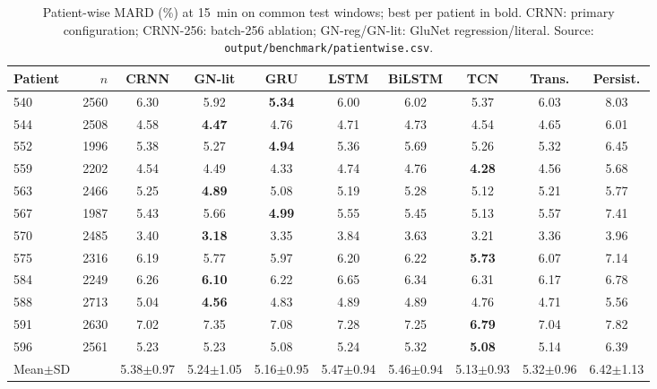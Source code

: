 \begin{table}[t]\centering
\caption{Patient-wise MARD (\%) at 15~min on common test windows; best per patient in bold. CRNN: primary configuration; CRNN-256: batch-256 ablation; GN-reg/GN-lit: GluNet regression/literal. Source: \texttt{output/benchmark/patientwise.csv}.}
\scriptsize\setlength{\tabcolsep}{3pt}
\begin{tabular}{lrcccccccc}\toprule
Patient & $n$ & CRNN & GN-lit & GRU & LSTM & BiLSTM & TCN & Trans. & Persist.\\\midrule
540 & 2560 & 6.30 & 5.92 & \textbf{5.34} & 6.00 & 6.02 & 5.37 & 6.03 & 8.03\\
544 & 2508 & 4.58 & \textbf{4.47} & 4.76 & 4.71 & 4.73 & 4.54 & 4.65 & 6.01\\
552 & 1996 & 5.38 & 5.27 & \textbf{4.94} & 5.36 & 5.69 & 5.26 & 5.32 & 6.45\\
559 & 2202 & 4.54 & 4.49 & 4.33 & 4.74 & 4.76 & \textbf{4.28} & 4.56 & 5.68\\
563 & 2466 & 5.25 & \textbf{4.89} & 5.08 & 5.19 & 5.28 & 5.12 & 5.21 & 5.77\\
567 & 1987 & 5.43 & 5.66 & \textbf{4.99} & 5.55 & 5.45 & 5.13 & 5.57 & 7.41\\
570 & 2485 & 3.40 & \textbf{3.18} & 3.35 & 3.84 & 3.63 & 3.21 & 3.36 & 3.96\\
575 & 2316 & 6.19 & 5.77 & 5.97 & 6.20 & 6.22 & \textbf{5.73} & 6.07 & 7.14\\
584 & 2249 & 6.26 & \textbf{6.10} & 6.22 & 6.65 & 6.34 & 6.31 & 6.17 & 6.78\\
588 & 2713 & 5.04 & \textbf{4.56} & 4.83 & 4.89 & 4.89 & 4.76 & 4.71 & 5.56\\
591 & 2630 & 7.02 & 7.35 & 7.08 & 7.28 & 7.25 & \textbf{6.79} & 7.04 & 7.82\\
596 & 2561 & 5.23 & 5.23 & 5.08 & 5.24 & 5.32 & \textbf{5.08} & 5.14 & 6.39\\
\midrule
Mean$\pm$SD & & 5.38$\pm$0.97 & 5.24$\pm$1.05 & 5.16$\pm$0.95 & 5.47$\pm$0.94 & 5.46$\pm$0.94 & 5.13$\pm$0.93 & 5.32$\pm$0.96 & 6.42$\pm$1.13\\
\bottomrule
\end{tabular}\end{table}
